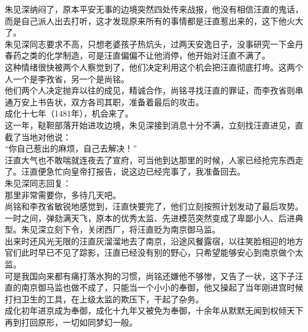 \begin{multicols}{\theparacolNo}
朱见深纳闷了，原本平安无事的边境突然四处传来战报，他没有相信汪直的鬼话，而是自己派人出去打听，这才发现原来所有的事情都是汪直惹出来的，这下他火大了。\\

朱见深同志要求不高，只想老婆孩子热炕头，过两天安逸日子，没事研究一下金丹春药之类的化学制造，可是汪直偏偏不让他消停，他开始对汪直不满了。\\

这种情绪很快被两个人察觉到了，他们决定利用这个机会把汪直彻底打垮。这两个人一个是李孜省，另一个是尚铭。\\

他们两个人决定抛弃以往的成见，精诚合作，尚铭寻找汪直的罪证，而李孜省则串通万安上书告状，双方各司其职，准备着最后的攻击。\\

成化十七年（1481年），机会来了。\\

这一年，鞑靼部落开始进攻边境，朱见深接到消息十分不满，立刻找汪直进见，直截了当地对他说：\\

“你自己惹出的麻烦，自己去解决！”\\

汪直大气也不敢喘就连夜去了宣府，可当他到达那里的时候，人家已经抢完东西走了。汪直便急忙向皇帝打报告，说这边已经完事了，我准备回去。\\

朱见深同志回复：\\

那里非常需要你，多待几天吧。\\

尚铭和李孜省敏锐地感觉到，汪直快要完了，他们立刻按照计划发动了最后攻势。一时之间，弹劾满天飞，原本的优秀太监、先进模范突然变成了卑鄙小人、后进典型。朱见深立刻下令，关闭西厂，将汪直贬为南京御马监。\\

出来时还风光无限的汪直灰溜溜地去了南京，沿途风餐露宿，以往笑脸相迎的地方官们此时早已不见了踪影，汪直已经没有别的野心，只希望能够安心到南京做个太监。\\

可是我国向来都有痛打落水狗的习惯，尚铭还嫌他不够惨，又告了一状，这下子汪直的南京御马监也做不成了，只能当一个小小的奉御，他又操起了当年刚进宫时候打扫卫生的工具，在上级太监的欺压下，干起了杂务。\\

成化初年进京成为奉御，成化十九年又被免为奉御，十余年从默默无闻到权倾天下再到打回原形，一切如同梦幻一般。\\


\end{multicols}
